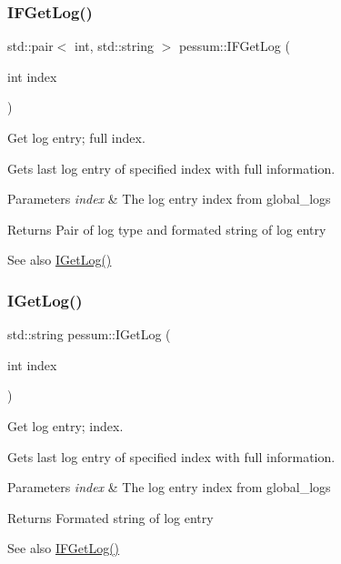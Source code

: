 \subsubsection{\texorpdfstring{I\+F\+Get\+Log()}{IFGetLog()}}
{\footnotesize\ttfamily std\+::pair$<$ int, std\+::string $>$ pessum\+::\+I\+F\+Get\+Log (\begin{DoxyParamCaption}\item[{int}]{index }\end{DoxyParamCaption})}



Get log entry; full index. 

Gets last log entry of specified index with full information. 
\begin{DoxyParams}{Parameters}
{\em index} & The log entry index from global\+\_\+logs \\
\hline
\end{DoxyParams}
\begin{DoxyReturn}{Returns}
Pair of log type and formated string of log entry 
\end{DoxyReturn}
\begin{DoxySeeAlso}{See also}
\hyperlink{namespacepessum_aeb38d643b26d768565f5a2c89b103f83}{I\+Get\+Log()} 
\end{DoxySeeAlso}
\mbox{\label{namespacepessum_aeb38d643b26d768565f5a2c89b103f83}} 
\subsubsection{\texorpdfstring{I\+Get\+Log()}{IGetLog()}}
{\footnotesize\ttfamily std\+::string pessum\+::\+I\+Get\+Log (\begin{DoxyParamCaption}\item[{int}]{index }\end{DoxyParamCaption})}



Get log entry; index. 

Gets last log entry of specified index with full information. 
\begin{DoxyParams}{Parameters}
{\em index} & The log entry index from global\+\_\+logs \\
\hline
\end{DoxyParams}
\begin{DoxyReturn}{Returns}
Formated string of log entry 
\end{DoxyReturn}
\begin{DoxySeeAlso}{See also}
\hyperlink{namespacepessum_a92df65a763df879d6902d5c5c600f1d4}{I\+F\+Get\+Log()} 
\end{DoxySeeAlso}
\mbox{\label{namespacepessum_a4d349f207308b877a48bb4907e15dc69}} 
